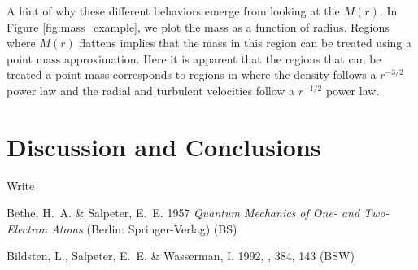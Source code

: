 \documentclass{emulateapj}
\begin{document}
A hint of why these different behaviors emerge from looking at the $M(r)$.  In Figure \ref{fig:mass_example}, we plot the mass as a function of radius.  Regions where $M(r)$ flattens implies that the mass in this region can be treated using a point mass approximation.  Here it is apparent that the regions that can be treated a point mass corresponds to regions in where the density follows a $r^{-3/2}$ power law and the radial and turbulent velocities follow a $r^{-1/2}$ power law. 

\begin{figure*}
\caption{WRITE CAPTION: Radial velocity, $v_r$ (blue line), and turbulent velocity, $v_{\rm rms}$ (green line) as a function of radial position from maximum density point.  A $r^{-1/2}$ power law is shown as a red line. \label{fig:mass_example}}
\end{figure*}

\section{Discussion and Conclusions}

\acknowledgments

Write

\begin{references}

\noindent
Bethe, H.~A. \& Salpeter, E.~E. 1957 \textit{Quantum Mechanics of One-
  and Two-Electron Atoms} (Berlin: Springer-Verlag) (BS) 

\noindent
Bildsten, L., Salpeter, E.~E. \& Wasserman, I. 1992, \apj, 384, 143
(BSW) 


\end{references}
\end{document}
